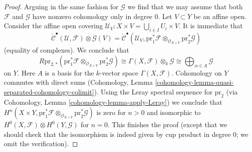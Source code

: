 \begin{proof}
\medskip\noindent
Arguing in the same fashion for $\mathcal{G}$ we find that we
may assume that both $\mathcal{F}$ and $\mathcal{G}$
have nonzero cohomology only in degree $0$.
Let $V \subset Y$ be an affine open. Consider the affine open covering
$\mathcal{U}_V : X \times V = \bigcup_{i \in I} U_i \times V$.
It is immediate that
$$
\check{\mathcal{C}}^\bullet(\mathcal{U}, \mathcal{F}) \otimes \mathcal{G}(V) =
\check{\mathcal{C}}^\bullet(\mathcal{U}_V,
\text{pr}_1^*\mathcal{F} \otimes_{\mathcal{O}_{X \times Y}}
\text{pr}_2^*\mathcal{G})
$$
(equality of complexes). We conclude that
$$
R\text{pr}_{2, *}(\text{pr}_1^*\mathcal{F} \otimes_{\mathcal{O}_{X \times Y}}
\text{pr}_2^*\mathcal{G})
\cong
\Gamma(X, \mathcal{F}) \otimes_k \mathcal{G} \cong
\bigoplus\nolimits_{\alpha \in A} \mathcal{G}
$$
on $Y$. Here $A$ is a basis for the $k$-vector space $\Gamma(X, \mathcal{F})$.
Cohomology on $Y$ commutes with direct sums
(Cohomology, Lemma \ref{cohomology-lemma-quasi-separated-cohomology-colimit}).
Using the Leray spectral sequence for $\text{pr}_2$
(via Cohomology, Lemma \ref{cohomology-lemma-apply-Leray})
we conclude that
$H^n(X \times Y, \text{pr}_1^*\mathcal{F} \otimes_{\mathcal{O}_{X \times Y}}
\text{pr}_2^*\mathcal{G})$
is zero for $n > 0$ and isomorphic to
$H^0(X, \mathcal{F}) \otimes H^0(Y, \mathcal{G})$ for $n = 0$.
This finishes the proof (except that we should check that the
isomorphism is indeed given by cup product in degree $0$; we omit
the verification).
\end{proof}
